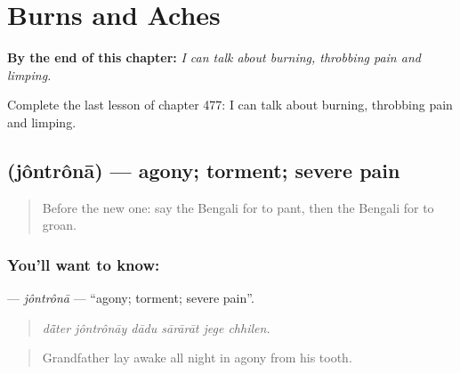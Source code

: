
\chapter{Burns and Aches}
\label{ch:bn-burns-and-aches}

\begin{chapteropening}
\textbf{By the end of this chapter:} \emph{I can talk about burning, throbbing pain and limping.}

Complete the last lesson of chapter 477: I can talk about burning, throbbing pain and limping.
\end{chapteropening}

\section[\texorpdfstring{\bn{যন্ত্রণা} (jôntrônā)}{যন্ত্রণা (jôntrônā)}]{ (jôntrônā) — agony; torment; severe pain}

\label{lesson:BN-C477-jontrona}



\begin{quote}
Before the new one: say the Bengali for to pant, then the Bengali for to groan.
\end{quote}

\subsection*{You'll want to know: }
\textbf{} — \emph{jôntrônā} — \textquotedblleft{}agony; torment; severe pain\textquotedblright{}.

\begin{quote}
     
\end{quote}

\begin{quote}
\emph{dā̃ter jôntrônāy dādu sārārāt jege chhilen.}
\end{quote}

\begin{quote}
Grandfather lay awake all night in agony from his tooth.
\end{quote}

